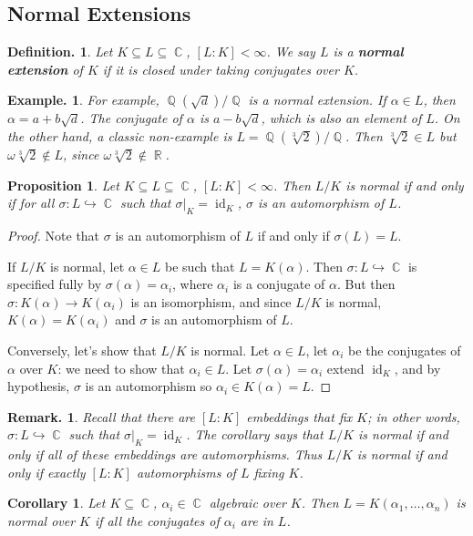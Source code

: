 \documentclass[11pt, a4paper]{memoir}
\DeclareMathOperator{\Q}{{\mathbb{Q}}}
\DeclareMathOperator{\R}{{\mathbb{R}}}
\DeclareMathOperator{\C}{{\mathbb{C}}}
\theoremstyle{change}
\newtheorem{corollary}[theorem]{Corollary}
\newtheorem{proposition}[theorem]{Proposition}
\theoremstyle{plain}
\theoremstyle{nonumberplain}
\newtheorem{definition}{Definition.}
\newtheorem{example}{Example.}
\newtheorem{remark}{Remark.}
\newtheorem{proof}{Proof}
\DeclareMathOperator{\id}{id}
\begin{document}
\subsection{Normal Extensions}
\begin{definition}
    Let $K\subseteq L\subseteq\C$, $[L:K]<\infty$.
    We say $L$ is a \textbf{normal extension} of $K$ if it is closed under taking conjugates over $K$.
\end{definition}
\begin{example}
    For example, $\Q(\sqrt{d})/\Q$ is a normal extension.
    If $\alpha\in L$, then $\alpha=a+b\sqrt{d}$.
    The conjugate of $\alpha$ is $a-b\sqrt{d}$, which is also an element of $L$.
    On the other hand, a classic non-example is $L=\Q(\sqrt[3]{2})/\Q$.
    Then $\sqrt[3]{2}\in L$ but $\omega\sqrt[3]{2}\notin L$, since $\omega\sqrt[3]{2}\notin\R$.
\end{example}
\begin{proposition}
    Let $K\subseteq L\subseteq\C$, $[L:K]<\infty$.
    Then $L/K$ is normal if and only if for all $\sigma:L\hookrightarrow\C$ such that $\sigma|_K=\id_K$, $\sigma$ is an automorphism of $L$.
\end{proposition}
\begin{proof}
    Note that $\sigma$ is an automorphism of $L$ if and only if $\sigma(L)=L$.

    If $L/K$ is normal, let $\alpha\in L$ be such that $L=K(\alpha)$.
    Then $\sigma:L\hookrightarrow\C$ is specified fully by $\sigma(\alpha)=\alpha_i$, where $\alpha_i$ is a conjugate of $\alpha$.
    But then $\sigma:K(\alpha)\to K(\alpha_i)$ is an isomorphism, and since $L/K$ is normal, $K(\alpha)=K(\alpha_i)$ and $\sigma$ is an automorphism of $L$.

    Conversely, let's show that $L/K$ is normal.
    Let $\alpha\in L$, let $\alpha_i$ be the conjugates of $\alpha$ over $K$: we need to show that $\alpha_i\in L$.
    Let $\sigma(\alpha)=\alpha_i$ extend $\id_K$, and by hypothesis, $\sigma$ is an automorphism so $\alpha_i\in K(\alpha)=L$.
\end{proof}
\begin{remark}
    Recall that there are $[L:K]$ embeddings that fix $K$; in other words, $\sigma:L\hookrightarrow\C$ such that $\sigma|_K=\id_K$.
    The corollary says that $L/K$ is normal if and only if all of these embeddings are automorphisms.
    Thus $L/K$ is normal if and only if exactly $[L:K]$ automorphisms of $L$ fixing $K$.
\end{remark}
\begin{corollary}
    Let $K\subseteq\C$, $\alpha_i\in\C$ algebraic over $K$.
    Then $L=K(\alpha_1,\ldots,\alpha_n)$ is normal over $K$ if all the conjugates of $\alpha_i$ are in $L$.
\end{corollary}
\end{document}
